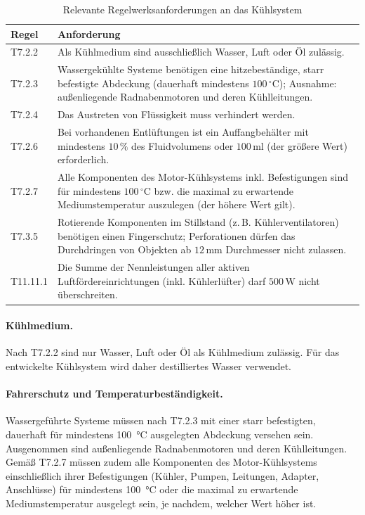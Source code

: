 \begin{table}[htb]
  \centering
  \caption{Relevante Regelwerksanforderungen an das Kühlsystem}
  \label{tab:regeln}
  \begin{tabular}{|l|p{}|}
    \hline
    Regel & Anforderung \\
    \hline
    T7.2.2   & Als Kühlmedium sind ausschließlich Wasser, Luft oder Öl zulässig. \\
    \hline
    T7.2.3   & Wassergekühlte Systeme benötigen eine hitzebeständige, starr
               befestigte Abdeckung (dauerhaft mindestens $100\,^{\circ}\mathrm{C}$);
               Ausnahme: außenliegende Radnabenmotoren und deren Kühlleitungen. \\
    \hline
    T7.2.4   & Das Austreten von Flüssigkeit muss verhindert werden. \\
    \hline
    T7.2.6   & Bei vorhandenen Entlüftungen ist ein Auffangbehälter mit mindestens
               $10\,\%$ des Fluidvolumens oder $100\,\mathrm{ml}$
               (der größere Wert) erforderlich. \\
    \hline
    T7.2.7   & Alle Komponenten des Motor-Kühlsystems inkl. Befestigungen sind für
               mindestens $100\,^{\circ}\mathrm{C}$ bzw. die maximal zu erwartende
               Mediumstemperatur auszulegen (der höhere Wert gilt). \\
    \hline
    T7.3.5   & Rotierende Komponenten im Stillstand (z.\,B. Kühlerventilatoren)
               benötigen einen Fingerschutz; Perforationen dürfen das Durchdringen
               von Objekten ab $12\,\mathrm{mm}$ Durchmesser nicht zulassen. \\
    \hline
    T11.11.1 & Die Summe der Nennleistungen aller aktiven Luftfördereinrichtungen
               (inkl. Kühlerlüfter) darf $500\,\mathrm{W}$ nicht überschreiten. \\
    \hline
  \end{tabular}
\end{table}

\paragraph{Kühlmedium.}
Nach T7.2.2 sind nur Wasser, Luft oder Öl als Kühlmedium zulässig. Für das
entwickelte Kühlsystem wird daher destilliertes Wasser verwendet.

\paragraph{Fahrerschutz und Temperaturbeständigkeit.}
Wassergeführte Systeme müssen nach T7.2.3 mit einer starr befestigten,
dauerhaft für mindestens \SI{100}{\celsius} ausgelegten Abdeckung versehen
sein. Ausgenommen sind außenliegende Radnabenmotoren und deren Kühlleitungen.
Gemäß T7.2.7 müssen zudem alle Komponenten des Motor-Kühlsystems einschließlich
ihrer Befestigungen (Kühler, Pumpen, Leitungen, Adapter, Anschlüsse) für
mindestens \SI{100}{\celsius} oder die maximal zu erwartende Mediumstemperatur
ausgelegt sein, je nachdem, welcher Wert höher ist.

